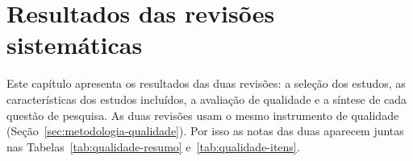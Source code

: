 \begingroup
\setlength{\emergencystretch}{3em}

\chapter{Resultados das revisões sistemáticas}
\label{cap:resultados-rsl}

Este capítulo apresenta os resultados das duas revisões: a seleção dos
estudos, as características dos estudos incluídos, a avaliação de qualidade e
a síntese de cada questão de pesquisa. As duas revisões usam o mesmo
instrumento de qualidade (Seção~\ref{sec:metodologia-qualidade}). Por isso as
notas das duas aparecem juntas nas Tabelas~\ref{tab:qualidade-resumo}
e~\ref{tab:qualidade-itens}.







\endgroup
